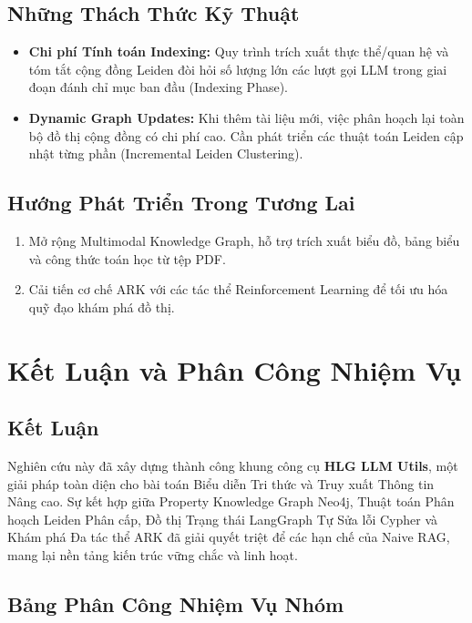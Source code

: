 \documentclass[11pt,a4paper]{report}
\begin{document}
\section{Những Thách Thức Kỹ Thuật}
\begin{itemize}
    \item \textbf{Chi phí Tính toán Indexing:} Quy trình trích xuất thực thể/quan hệ và tóm tắt cộng đồng Leiden đòi hỏi số lượng lớn các lượt gọi LLM trong giai đoạn đánh chỉ mục ban đầu (Indexing Phase).
    \item \textbf{Dynamic Graph Updates:} Khi thêm tài liệu mới, việc phân hoạch lại toàn bộ đồ thị cộng đồng có chi phí cao. Cần phát triển các thuật toán Leiden cập nhật từng phần (Incremental Leiden Clustering).
\end{itemize}

\section{Hướng Phát Triển Trong Tương Lai}
\begin{enumerate}
    \item Mở rộng Multimodal Knowledge Graph, hỗ trợ trích xuất biểu đồ, bảng biểu và công thức toán học từ tệp PDF.
    \item Cải tiến cơ chế ARK với các tác thể Reinforcement Learning để tối ưu hóa quỹ đạo khám phá đồ thị.
\end{enumerate}

\chapter{Kết Luận và Phân Công Nhiệm Vụ}

\section{Kết Luận}
Nghiên cứu này đã xây dựng thành công khung công cụ \textbf{HLG LLM Utils}, một giải pháp toàn diện cho bài toán Biểu diễn Tri thức và Truy xuất Thông tin Nâng cao. Sự kết hợp giữa Property Knowledge Graph Neo4j, Thuật toán Phân hoạch Leiden Phân cấp, Đồ thị Trạng thái LangGraph Tự Sửa lỗi Cypher và Khám phá Đa tác thể ARK đã giải quyết triệt để các hạn chế của Naive RAG, mang lại nền tảng kiến trúc vững chắc và linh hoạt.

\section{Bảng Phân Công Nhiệm Vụ Nhóm}
\end{document}
